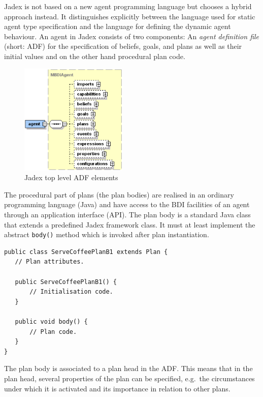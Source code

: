 Jadex is not based on a new agent programming language but chooses a hybrid approach instead.
It distinguishes explicitly between the language used for static agent type specification and the language for defining the dynamic agent behaviour.
An agent in Jadex consists of two components: An \emph{agent definition file} (short: ADF) for the specification of beliefs, goals, and plans as well as their initial values and on the other hand procedural plan code.
\begin{figure}
	\centering
	\includegraphics[height=200px]{images/jadexagentadf.png}
  \caption{Jadex top level ADF elements \cite{ActiveComponents}}
	\label{fig3}
\end{figure}
The procedural part of plans (the plan bodies) are realised in an ordinary programming language (Java) and have access to the BDI facilities of an agent through an application interface (API).
The plan body is a standard Java class that extends a predefined Jadex framework class.
It must at least implement the abstract \texttt{body()} method which is invoked after plan instantiation.
\begin{lstlisting}[caption={Jadex Java class}, label=lst:jadex_java]
public class ServeCoffeePlanB1 extends Plan {
   // Plan attributes.

   public ServeCoffeePlanB1() {
       // Initialisation code.
   }

   public void body() {
       // Plan code.
   }
}
\end{lstlisting}
The plan body is associated to a plan head in the ADF.
This means that in the plan head, several properties of the plan can be specified, e.g.\ the circumstances under which it is activated and its importance in relation to other plans.
